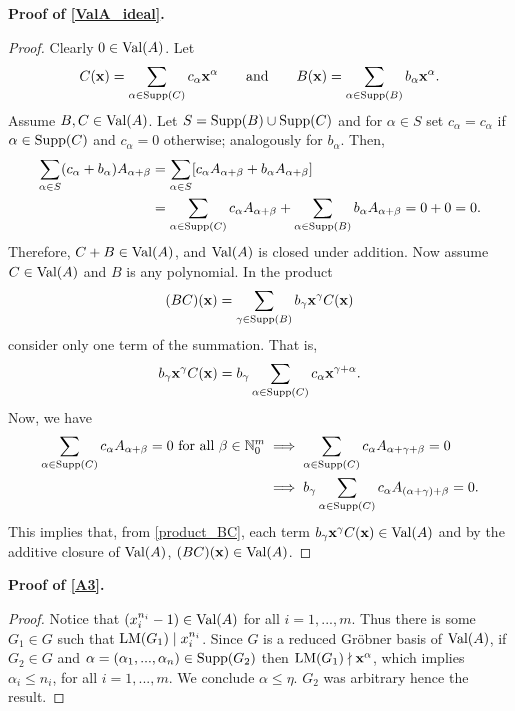 \documentclass[12pt]{article}
\renewcommand{\vec}[1]{\textup{\textbf{#1}}}
\newcommand{\lm}{\textup{LM}}
\newcommand{\supp}{\textup{Supp}}
\newcommand{\val}{\textup{Val}}
\theoremstyle{definition}
\theoremstyle{definition}
\theoremstyle{definition}
\theoremstyle{plain}
\theoremstyle{plain}
\numberwithin{equation}{section}
\begin{document}
\noindent\textbf{Proof of \cref{ValA_ideal}.}
\begin{proof}
    Clearly $0 \in \val(A)$. 
    Let 
    \[
        C(\vec{x}) = \sum_{\alpha \in \supp(C)} c_\alpha\vec{x}^\alpha \qquad\textup{and}\qquad
        B(\vec{x}) = \sum_{\alpha \in \supp(B)} b_\alpha\vec{x}^\alpha.
    \]
    Assume $B,C \in \val(A)$. 
    Let $S = \supp(B) \cup \supp(C)$ and for $\alpha \in S$ set $c_\alpha = c_\alpha$ if $\alpha \in \supp(C)$ and $c_\alpha = 0$ otherwise; analogously for $b_\alpha$. 
    Then,
    \begin{align*}
        \sum_{\alpha \in S} (c_\alpha + b_\alpha)A_{\alpha + \beta} &= \sum_{\alpha \in S} [c_\alpha A_{\alpha + \beta} + b_\alpha A_{\alpha + \beta}]\\
        &= \sum_{\alpha \in \supp(C)} c_\alpha A_{\alpha + \beta} + \sum_{\alpha \in \supp(B)} b_\alpha A_{\alpha + \beta} = 
        0 + 0 = 0.
    \end{align*}
    Therefore, $C+B \in \val(A)$, and $\val(A)$ is closed under addition. 
    Now assume $C \in \val(A)$ and $B$ is any polynomial. 
    In the product
    \begin{equation}\label{product_BC}
        (BC)(\vec{x}) = \sum_{\gamma \in \supp(B)} b_\gamma \vec{x}^\gamma C(\vec{x})
    \end{equation}
    consider only one term of the summation. 
    That is,
    \[
        b_\gamma \vec{x}^\gamma C(\vec{x}) = b_\gamma \sum_{\alpha \in \supp(C)} c_\alpha\vec{x}^{\gamma + \alpha}.
    \]
    Now, we have
    \begin{align*}
        \sum_{\alpha \in \supp(C)} c_\alpha A_{\alpha + \beta} = 0 \textup{ for all } \beta \in \mathbb{N}_0^m &\implies \sum_{\alpha \in \supp(C)} c_\alpha A_{\alpha + \gamma + \beta} = 0\\
        &\implies b_\gamma \sum_{\alpha \in \supp(C)} c_\alpha A_{(\alpha + \gamma) + \beta} = 0.
    \end{align*}
    This implies that, from \cref{product_BC}, each term $b_\gamma \vec{x}^\gamma C(\vec{x}) \in \val(A)$ and by the additive closure of $\val(A)$, $(BC)(\vec{x}) \in \val(A)$.
\end{proof}


\noindent\textbf{Proof of \cref{A3}.}
\begin{proof}
    Notice that $(x_i^{n_i} - 1) \in \val(A)$ for all $i = 1, ..., m$. 
    Thus there is some $G_1 \in G$ such that $\lm(G_1) \mid x_i^{n_i}$. 
    Since $G$ is a reduced Gr\"obner basis of $\val(A)$,  if $G_2 \in G$ and $\alpha = (\alpha_1, ..., \alpha_n) \in \supp(G_2)$ then $\lm(G_1) \nmid \vec{x}^\alpha$, which implies $\alpha_i \leqslant n_i$, for all $i = 1, ..., m$. 
    We conclude $\alpha \leqslant \eta$. 
    $G_2$ was arbitrary hence the result.
\end{proof}
\end{document}
